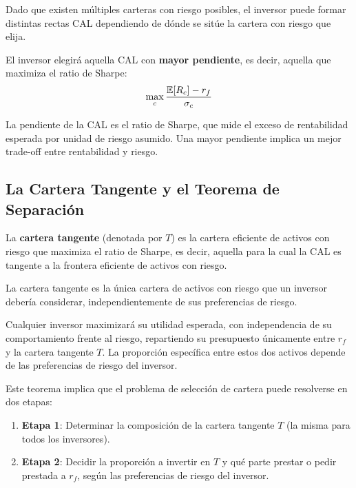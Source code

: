 Dado que existen múltiples carteras con riesgo posibles, el inversor puede formar distintas rectas CAL dependiendo de dónde se sitúe la cartera con riesgo que elija.

\begin{teorema}
El inversor elegirá aquella CAL con \textbf{mayor pendiente}, es decir, aquella que maximiza el ratio de Sharpe:
\begin{equation}
\max_c \frac{\mathbb{E}[R_c] - r_f}{\sigma_c}
\end{equation}
\end{teorema}

La pendiente de la CAL es el ratio de Sharpe, que mide el exceso de rentabilidad esperada por unidad de riesgo asumido. Una mayor pendiente implica un mejor trade-off entre rentabilidad y riesgo.

\subsection{La Cartera Tangente y el Teorema de Separación}

\begin{definicion}
La \textbf{cartera tangente} (denotada por $T$) es la cartera eficiente de activos con riesgo que maximiza el ratio de Sharpe, es decir, aquella para la cual la CAL es tangente a la frontera eficiente de activos con riesgo.
\end{definicion}

La cartera tangente es la única cartera de activos con riesgo que un inversor debería considerar, independientemente de sus preferencias de riesgo.

\begin{teorema}
Cualquier inversor maximizará su utilidad esperada, con independencia de su comportamiento frente al riesgo, repartiendo su presupuesto únicamente entre $r_f$ y la cartera tangente $T$. La proporción específica entre estos dos activos depende de las preferencias de riesgo del inversor.
\end{teorema}

Este teorema implica que el problema de selección de cartera puede resolverse en dos etapas:

\begin{enumerate}
\item \textbf{Etapa 1}: Determinar la composición de la cartera tangente $T$ (la misma para todos los inversores).
\item \textbf{Etapa 2}: Decidir la proporción a invertir en $T$ y qué parte prestar o pedir prestada a $r_f$, según las preferencias de riesgo del inversor.
\end{enumerate}

